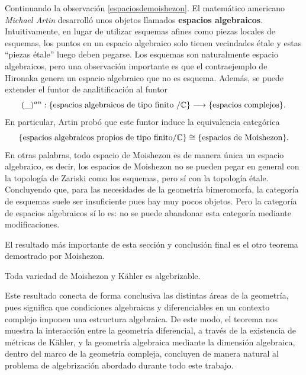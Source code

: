 \begin{remark}\parencite[Chap. VII, Sec. 6.4]{grauertremment}
	Continuando la observación \ref{espaciosdemoishezon}. El matemático americano \textit{Michael Artin} desarrolló unos objetos llamados \textbf{espacios algebraicos}. Intuitivamente, en lugar de utilizar esquemas afines como piezas locales de esquemas, los puntos en un espacio algebraico solo tienen vecindades étale y estas \enquote{piezas étale} luego deben pegarse. Los esquemas son naturalmente espacio algebraicos, pero una observación importante es que el contraejemplo de Hironaka genera un espacio algebraico que no es esquema. Además, se puede extender el funtor de analitificación al funtor
	\begin{equation*}
		(\_)^{an}:\{\text{espacios algebraicos de tipo finito }/\mathbb{C}\}\longrightarrow\{\text{espacios complejos}\}.
	\end{equation*}
	En particular, Artin probó que este funtor induce la equivalencia categórica
	\begin{equation*}
		\{\text{espacios algebraicos propios de tipo finito}/\mathbb{C}\}\cong\{\text{espacios de Moishezon}\}.
	\end{equation*}
	En otras palabras, todo espacio de Moishezon es de manera única un espacio algebraico, es decir, los espacios de Moishezon no se pueden pegar en general con la topología de Zariski como los esquemas, pero sí con la topología étale. Concluyendo que, para las necesidades de la geometría bimeromorfa, la categoría de esquemas suele ser insuficiente pues hay muy pocos objetos. Pero la categoría de espacios algebraicos sí lo es: no se puede abandonar esta categoría mediante modificaciones. 
\end{remark}

El resultado más importante de esta sección y conclusión final es el otro teorema demostrado por Moishezon.

\begin{theorem}\parencite{Moishezon1967}\label{fundamentaldemoishezon}
	Toda variedad de Moishezon y Kähler es algebrizable.
\end{theorem}

Este resultado conecta de forma conclusiva las distintas áreas de la geometría, pues significa que condiciones algebraicas y diferenciables en un contexto complejo imponen una estructura algebraica. De este modo, el teorema nos muestra la interacción entre la geometría diferencial, a través de la existencia de métricas de Kähler, y la geometría algebraica mediante la dimensión algebraica, dentro del marco de la geometría compleja, concluyen de manera natural al problema de algebrización abordado durante todo este trabajo. 